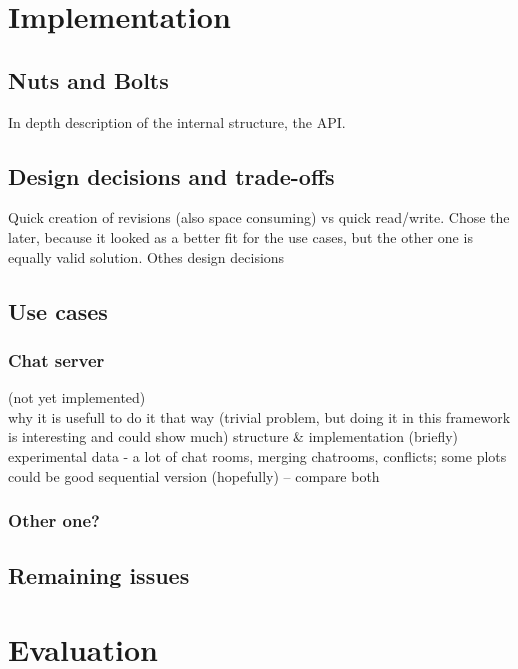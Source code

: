 \documentclass[12pt,twoside,notitlepage]{report}
\begin{document}
\cleardoublepage
\chapter{Implementation}

\section{Nuts and Bolts}

In depth description of the internal structure, the API.

\section{Design decisions and trade-offs}

Quick creation of revisions (also space consuming) vs quick read/write. Chose the later, because it looked as a better fit for the use cases, but the other one is equally valid solution. Othes design decisions

 
\section{Use cases}
\subsection{Chat server}
(not yet implemented)\\
 
 
 why it is usefull to do it that way (trivial problem, but doing it in this framework is interesting and could show much)
structure \& implementation (briefly)
experimental data - a lot of chat rooms, merging chatrooms, conflicts; some plots could be good
sequential version (hopefully) – compare both
   
\subsection{Other one?}

\section{Remaining issues}






\cleardoublepage
\chapter{Evaluation}
\end{document}
